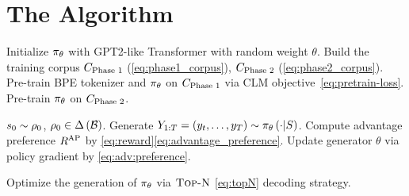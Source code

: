 

\section{The \algname Algorithm}

\begin{algorithm}[t]
    \caption{\algname}\label{alg:scaffoldgpt}
    \begin{algorithmic}[1] 
    \State Initialize $\pi_{{\theta}}$ with GPT2-like Transformer with random weight $\theta$.
    \State Build the training corpus $C_\text{Phase 1}$ (\ref{eq:phase1_corpus}), $C_\text{Phase 2}$ (\ref{eq:phase2_corpus}).
    \State Pre-train BPE tokenizer and $\pi_{{\theta}}$ on  $C_\text{Phase 1}$ via CLM objective~\eqref{eq:pretrain-loss}.
    \State Pre-train $\pi_{{\theta}}$ on  $C_\text{Phase 2}$.

    
    
    
            \State $s_0 \sim \rho_0$, { $\rho_0\in \Delta \left( {\mathcal{B}} \right) $}.
            \State Generate $Y_{1:T}= \left( {y_t,\ldots,y_{T}} \right) \sim \pi_{{\theta}} \left( {\cdot|S} \right) $.
            \State Compute advantage preference
            {$R^\text{AP}$}
            by \eqref{eq:reward}\eqref{eq:advantage_preference}.
            \State Update generator $\theta$
            via policy gradient by \eqref{eq:adv:preference}.
    \EndFor
    
    \State Optimize the generation of $\pi_{{\theta}}$ via $\textsc{Top-N}$ \eqref{eq:topN} decoding strategy.    
    \end{algorithmic}
\end{algorithm}









